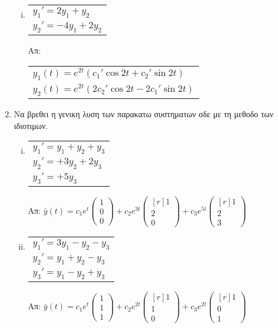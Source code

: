 \begin{enumerate}
\begin{enumerate}[i)]
\item \begin{tabular}{l} $y_1'=2y_1+y_2$ \\ $y_2'=-4y_1+2y_2$\end{tabular} \hfill Απ: \begin{tabular}{l}
$y_1(t)=e^{2t}(c_1'\cos 2t+c_2'\sin 2t)$ \\
$y_2(t)=e^{2t}(2c_2'\cos 2t-2c_1'\sin 2t)$
\end{tabular}

\end{enumerate}

\item Να βρεθει η γενικη λυση των παρακατω συστηματων σδε με τη μεθοδο των ιδιοτιμων.

\begin{enumerate}[i)]

\item \begin{tabular}{l} $y_1'=y_1+y_2+y_3$ \\ $y_2'=+3y_2+2y_3$ \\ $y_3'=+5y_3$\end{tabular}\hfill Απ: $\scriptstyle{\bar{y}(t)=c_1e^{t}\begin{pmatrix*}
1\\0\\0
\end{pmatrix*}+c_2e^{3t}\begin{pmatrix*}[r]
1\\2\\0
\end{pmatrix*}+c_3e^{5t}\begin{pmatrix*}[r]
1\\2\\3
\end{pmatrix*}}$

\item  \begin{tabular}{l} $y_1'=3y_1-y_2-y_3$ \\ $y_2'=y_1+y_2-y_3$ \\ $y_3'=y_1-y_2+y_3$\end{tabular}\hfill Απ: $\scriptstyle{\bar{y}(t)=c_1e^{t}\begin{pmatrix*}
1\\1\\1
\end{pmatrix*}+c_2e^{2t}\begin{pmatrix*}[r]
1\\1\\0
\end{pmatrix*}+c_3e^{2t}\begin{pmatrix*}[r]
1\\0\\1
\end{pmatrix*}}$



\end{enumerate}
\end{enumerate}
